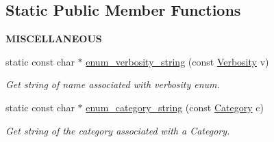 \subsection*{Static Public Member Functions}
\begin{Indent}{\bf M\+I\+S\+C\+E\+L\+L\+A\+N\+E\+O\+US}\par
\begin{DoxyCompactItemize}
\item 
static const char $\ast$ \hyperlink{class_loom_module_aaf32cb6107f0402822c615e9cd38eaef}{enum\+\_\+verbosity\+\_\+string} (const \hyperlink{_misc_8h_abf3be10d03894afb391f3a2935e3b313}{Verbosity} v)
\begin{DoxyCompactList}\small\item\em Get string of name associated with verbosity enum. \end{DoxyCompactList}\item 
static const char $\ast$ \hyperlink{class_loom_module_a7fc17923cdef15e3a60a871a2458eaad}{enum\+\_\+category\+\_\+string} (const \hyperlink{class_loom_module_a0c6ecc60315f95af551138dc83567068}{Category} c)
\begin{DoxyCompactList}\small\item\em Get string of the category associated with a Category. \end{DoxyCompactList}\end{DoxyCompactItemize}
\end{Indent}
